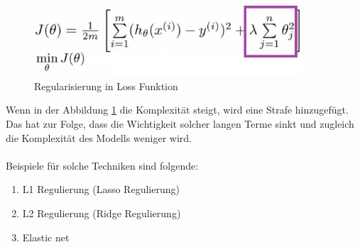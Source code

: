 \documentclass[12pt,oneside,a4paper,parskip]{scrbook}
\begin{document}
\begin{figure}[h]
	\begin{center}
		\includegraphics[width=10cm]{Bilder/regFunc.png}
		\caption{Regularisierung in Loss Funktion}
		\label{fig:regFunc}
	\end{center}
\end{figure}
Wenn in der Abbildung \ref{fig:regFunc} die Komplexität steigt, wird eine Strafe hinzugefügt. Das hat zur Folge, dass die Wichtigkeit solcher langen Terme sinkt und zugleich die Komplexität des Modells weniger wird.
\\\\
Beispiele für solche Techniken sind folgende:
\begin{enumerate}
	\item L1 Regulierung (Lasso Regulierung)
	\item L2 Regulierung (Ridge Regulierung)
	\item Elastic net
\end{enumerate}
\end{document}
